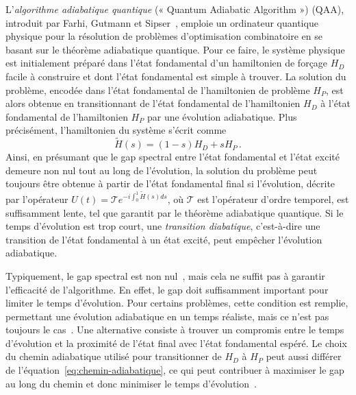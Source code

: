 L'\textit{algorithme adiabatique quantique} (« Quantum Adiabatic Algorithm ») (QAA), introduit par Farhi, Gutmann et Sipser~\cite{farhiQuantumComputationAdiabatic2000}, emploie un ordinateur quantique physique pour la résolution de problèmes d'optimisation combinatoire en se basant sur le théorème adiabatique quantique. Pour ce faire, le système physique est initialement préparé dans l'état fondamental d'un hamiltonien de forçage $H_{D}$ facile à construire et dont l'état fondamental est simple à trouver. La solution du problème, encodée dans l'état fondamental de l'hamiltonien de problème $H_{P}$, est alors obtenue en transitionnant de l'état fondamental de l'hamiltonien $H_{D}$ à l'état fondamental de l'hamiltonien $H_{P}$ par une évolution adiabatique. Plus précisément, l'hamiltonien du système s'écrit comme
\begin{equation}
\label{eq:chemin-adiabatique}    
    \tilde{H}(s) = \left(1-s\right) H_{D} + s H_{P} \,.
\end{equation}
Ainsi, en présumant que le gap spectral entre l'état fondamental et l'état excité demeure non nul tout au long de l'évolution, la solution du problème peut toujours être obtenue à partir de l'état fondamental final si l'évolution, décrite par l'opérateur $U(t) = \mathcal{T} e^{-i \int_{0}^{1} \tilde{H}(s) ds}$, où $\mathcal{T}$ est l'opérateur d'ordre temporel, est suffisamment lente, tel que garantit par le théorème adiabatique quantique. Si le temps d'évolution est trop court, une \textit{transition diabatique}, c'est-à-dire une transition de l'état fondamental à un état excité, peut empêcher l'évolution adiabatique.

Typiquement, le gap spectral est non nul~\cite{farhiQuantumComputationAdiabatic2000}, mais cela ne suffit pas à garantir l'efficacité de l'algorithme. En effet, le gap doit suffisamment important pour limiter le temps d'évolution. Pour certains problèmes, cette condition est remplie, permettant une évolution adiabatique en un temps réaliste, mais ce n'est pas toujours le cas~\cite{altshulerAndersonLocalizationMakes2010}. Une alternative consiste à trouver un compromis entre le temps d'évolution et la proximité de l'état final avec l'état fondamental espéré. Le choix du chemin adiabatique utilisé pour transitionner de $H_{D}$ à $H_{P}$ peut aussi différer de l'équation~\ref{eq:chemin-adiabatique}, ce qui peut contribuer à maximiser le gap au long du chemin et donc minimiser le temps d'évolution~\cite{nishimoriExponentialEnhancementEfficiency2017, hormoziNonstoquasticHamiltoniansQuantum2017}.

